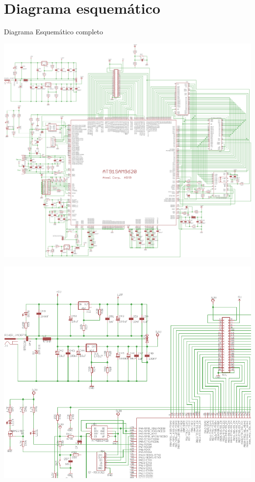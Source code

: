 \chapter{Diagrama esquem\'atico}\label{ch:esquematico} 



Diagrama Esquemático completo

\includegraphics[scale=0.35]{appendix/samEsquematico}

\pagebreak{}

\includegraphics[scale=0.45]{appendix/samEsq1}

